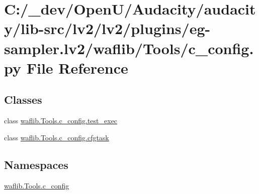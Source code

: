 \hypertarget{lv2_2plugins_2eg-sampler_8lv2_2waflib_2_tools_2c__config_8py}{}\section{C\+:/\+\_\+dev/\+Open\+U/\+Audacity/audacity/lib-\/src/lv2/lv2/plugins/eg-\/sampler.lv2/waflib/\+Tools/c\+\_\+config.py File Reference}
\label{lv2_2plugins_2eg-sampler_8lv2_2waflib_2_tools_2c__config_8py}
\subsection*{Classes}
\begin{DoxyCompactItemize}
\item 
class \hyperlink{classwaflib_1_1_tools_1_1c__config_1_1test__exec}{waflib.\+Tools.\+c\+\_\+config.\+test\+\_\+exec}
\item 
class \hyperlink{classwaflib_1_1_tools_1_1c__config_1_1cfgtask}{waflib.\+Tools.\+c\+\_\+config.\+cfgtask}
\end{DoxyCompactItemize}
\subsection*{Namespaces}
\begin{DoxyCompactItemize}
\item 
 \hyperlink{namespacewaflib_1_1_tools_1_1c__config}{waflib.\+Tools.\+c\+\_\+config}
\end{DoxyCompactItemize}
